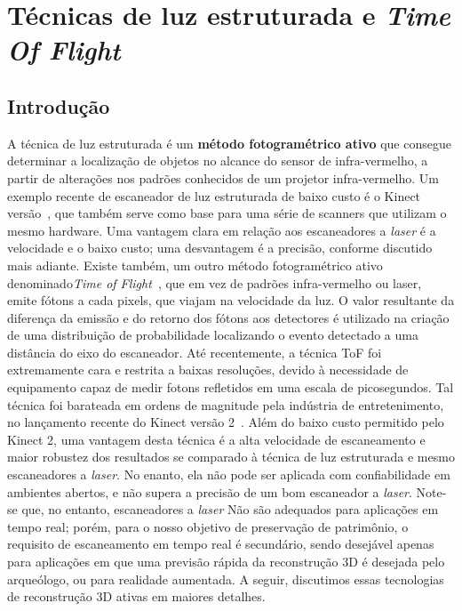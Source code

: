 \chapter{Técnicas de luz estruturada e \emph{Time Of Flight}}\label{cap:kinect}

\section*{Introdução}

A técnica de luz estruturada é um
\textbf{método fotogramétrico ativo} que consegue determinar a localização de objetos
no alcance do sensor de infra-vermelho, a partir de alterações nos padrões conhecidos de um projetor 
infra-vermelho. Um exemplo recente de escaneador de luz estruturada de baixo custo
é o Kinect versão~\cite{smisek20133d}, que também serve como base para uma
série de scanners que utilizam o mesmo hardware. Uma vantagem clara em relação
aos escaneadores a \emph{laser} é a velocidade e o baixo custo; uma desvantagem
é a precisão, conforme discutido mais adiante.  Existe também, um outro método
fotogramétrico ativo denominado\emph{Time of Flight}~\cite{gokturk2004time},
que em vez de padrões infra-vermelho ou laser, emite fótons a cada pixels, que
viajam na velocidade da luz. O valor resultante da diferença da
emissão e do retorno dos fótons aos
detectores é utilizado na criação de uma distribuição de probabilidade 
localizando o evento detectado a uma distância do eixo do escaneador.
Até recentemente, a técnica ToF foi extremamente cara e restrita a baixas resoluções, devido à
necessidade de equipamento capaz de medir fotons refletidos em uma escala de
picosegundos. Tal técnica foi barateada em ordens de magnitude pela indústria
de entretenimento, no lançamento recente do Kinect versão
2~\cite{lachat2015first,valgma20163d}. Além do baixo custo permitido pelo
Kinect 2, uma vantagem desta técnica é a alta velocidade de escaneamento e
maior robustez dos resultados se comparado à técnica de luz estruturada e mesmo escaneadores a \emph{laser}.
No enanto, ela não pode ser aplicada com confiabilidade em ambientes abertos,
e não supera a precisão de um bom escaneador a \emph{laser}. Note-se que, no entanto, escaneadores a \emph{laser} Não são adequados para aplicações em tempo real; porém, para o nosso objetivo de preservação de patrimônio,
o requisito de escaneamento em tempo real é secundário, sendo desejável apenas para aplicações em que uma previsão rápida da reconstrução 3D é desejada pelo arqueólogo, ou para realidade aumentada.
A seguir, discutimos essas tecnologias de reconstrução 3D ativas em maiores detalhes.

